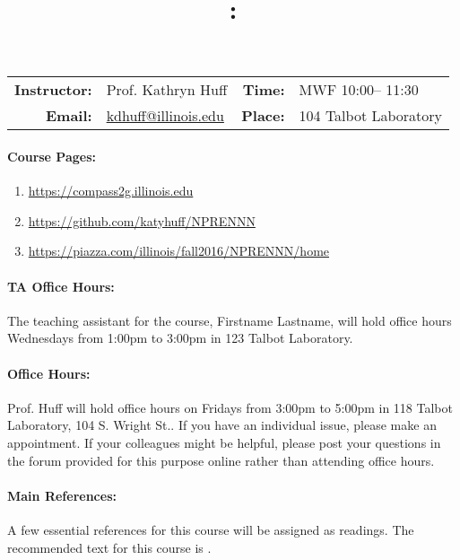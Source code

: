 \documentclass[11pt, a4paper]{article}
\title{\CourseNumber: \CourseTitle\\}
\author{\CourseUniversity}
\date{\CourseSemester \CourseYear}
\makeatletter
\newcommand{\CourseNumber}{NPRENNN}
\newcommand{\CourseInstructor}{Prof. Kathryn Huff\xspace}%
\newcommand{\CourseDays}{MWF\xspace}%
\newcommand{\CourseStart}{10:00\xspace}%
\newcommand{\CourseEnd}{11:30\xspace}%
\newcommand{\CourseInstructorEmail}{kdhuff@illinois.edu}
\newcommand{\CourseRoom}{104\xspace}%
\newcommand{\CourseBuilding}{Talbot Laboratory\xspace}%
\newcommand{\TeachingAssistant}{Firstname Lastname\xspace}%
\newcommand{\TAOfficeHourDays}{Wednesdays\xspace}%
\newcommand{\TAOfficeHourStart}{1:00pm\xspace}%
\newcommand{\TAOfficeHourEnd}{3:00pm\xspace}%
\newcommand{\TAOfficeHourPlace}{123 Talbot Laboratory\xspace}
\newcommand{\HuffOfficeHourDays}{Fridays\xspace}%
\newcommand{\HuffOfficeHourStart}{3:00pm\xspace}%
\newcommand{\HuffOfficeHourEnd}{5:00pm\xspace}%
\newcommand{\HuffOfficeHourPlace}{118 Talbot Laboratory, 104 S. Wright St.\xspace}
\makeatother
\begin{document}
\maketitle
\renewcommand{\arraystretch}{1.5}
\begin{center}
\begin{table}[h]
\begin{tabularx}{\textwidth}{rXrX}
\hline
\textbf{Instructor:} & \CourseInstructor & \textbf{Time:} & \CourseDays \CourseStart -- \CourseEnd \\
\textbf{Email:} &  \href{mailto:\CourseInstructorEmail}{\CourseInstructorEmail} & \textbf{Place:} & \CourseRoom \CourseBuilding\\
\hline
\end{tabularx}
\end{table}
\end{center}

\paragraph{Course Pages:}
\begin{enumerate}
        \item \url{https://compass2g.illinois.edu}
        \item \url{https://github.com/katyhuff/\CourseNumber}
        \item \url{https://piazza.com/illinois/fall2016/\CourseNumber/home}
\end{enumerate}

\paragraph{TA Office Hours:} The teaching assistant for the course, 
\TeachingAssistant, will hold office hours \TAOfficeHourDays from 
\TAOfficeHourStart to \TAOfficeHourEnd in \TAOfficeHourPlace.

\paragraph{Office Hours:} Prof. Huff will hold office hours on 
\HuffOfficeHourDays from \HuffOfficeHourStart to \HuffOfficeHourEnd in \HuffOfficeHourPlace.
If you have an individual issue, please make an appointment. If your colleagues 
might be helpful, please post your questions in the forum provided for this 
purpose online rather than attending office hours.

\paragraph{Main References:}
A few essential references for this course will be assigned as readings. The 
recommended text for this course is \cite{rec_text}.

\renewcommand{\refname}{\normalfont\selectfont\normalsize}\vspace{-1cm} 

\end{document}
